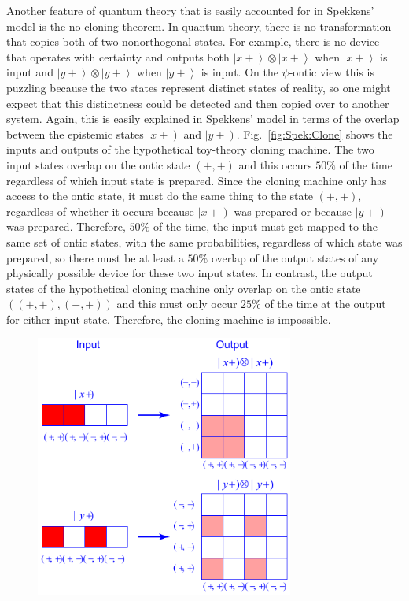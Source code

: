 \documentclass[DIV=calc,fontsize=12pt]{scrartcl} %
\theoremstyle{definition}
\theoremstyle{plain}
\newcommand{\RKet}[1]{\ensuremath{\left \vert #1 \right )}}
\newcommand{\Ket}[1]{\ensuremath{\left \vert #1 \right \rangle}}
\begin{document}
Another feature of quantum theory that is easily accounted for in
Spekkens' model is the no-cloning theorem.  In quantum theory, there
is no transformation that copies both of two nonorthogonal states.
For example, there is no device that operates with certainty and
outputs both $\Ket{x+}\otimes\Ket{x+}$ when $\Ket{x+}$ is input and
$\Ket{y+}\otimes\Ket{y+}$ when $\Ket{y+}$ is input.  On the
$\psi$-ontic view this is puzzling because the two states represent
distinct states of reality, so one might expect that this distinctness
could be detected and then copied over to another system.  Again, this
is easily explained in Spekkens' model in terms of the overlap between
the epistemic states $\RKet{x+}$ and $\RKet{y+}$.
Fig.~\ref{fig:Spek:Clone} shows the inputs and outputs of the
hypothetical toy-theory cloning machine.  The two input states overlap
on the ontic state $(+,+)$ and this occurs $50\%$ of the time
regardless of which input state is prepared.  Since the cloning
machine only has access to the ontic state, it must do the same thing
to the state $(+,+)$, regardless of whether it occurs because
$\RKet{x+}$ was prepared or because $\RKet{y+}$ was prepared.
Therefore, $50\%$ of the time, the input must get mapped to the same
set of ontic states, with the same probabilities, regardless of which
state was prepared, so there must be at least a $50\%$ overlap of the
output states of any physically possible device for these two input
states.  In contrast, the output states of the hypothetical cloning
machine only overlap on the ontic state $((+,+),(+,+))$ and this must
only occur $25\%$ of the time at the output for either input state.
Therefore, the cloning machine is impossible.
\begin{figure}[t!]
\centering
\includegraphics[width=85mm]{Fig4.pdf}
\caption{}
\end{figure}
\end{document}
